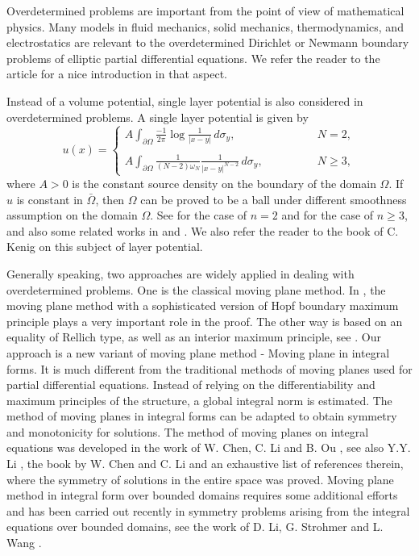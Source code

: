 \documentclass[12pt]{amsproc}
\theoremstyle{plain}
\numberwithin{equation}{section}
\begin{document}
Overdetermined problems are important from the point of view of
mathematical physics. Many models in fluid mechanics, solid
mechanics, thermodynamics, and electrostatics are relevant to the
overdetermined Dirichlet or Newmann boundary problems of elliptic
partial differential equations.
 We refer the reader to the article \cite{FG} for a nice introduction in that aspect.

Instead of a volume potential, single layer potential is also
considered in overdetermined problems. A single layer potential is
given by
\begin{equation}
u(x)=\left \{ \begin{array}{lll}
 A \int_{\partial\Omega}\frac{-1}{2 \pi} \log{\frac{1}{|x-y|}} \,d\sigma_y, \qquad \qquad  & N=2,\\
\\
A \int_{\partial\Omega}
\frac{1}{(N-2)\omega_N}\frac{1}{|x-y|^{N-2}}\,d\sigma_y, \qquad
\qquad & N\geq 3,
\end{array} \right.
\label{sig}
\end{equation}
where $A>0$ is the constant source density on the boundary of the
domain $\Omega$. If $u$ is constant in $\bar\Omega$, then $\Omega$
can be proved to be a ball under different smoothness assumption  on
the  domain $\Omega$.
 See \cite{M} for the case of $n=2$ and
\cite{R1} for the case of $n\geq 3$, and also some related works in
\cite{Lim} and \cite{Sh}. We also refer the reader to the book of C.
Kenig \cite{K} on this subject of layer potential.

Generally speaking,  two approaches are widely applied in dealing
with overdetermined problems. One is the classical moving plane
method. In \cite{Se}, the moving plane method with a sophisticated
version of Hopf boundary maximum principle plays a very important
role in the proof. The other way is based on an equality of Rellich
type, as well as an interior maximum principle, see \cite{W}. Our
approach is a new variant of moving plane method - Moving plane in
integral forms. It is much different from the traditional methods of
moving planes used for partial differential equations. Instead of
relying on the differentiability and maximum principles of the
structure, a global integral norm is estimated. The method of moving
planes in integral forms can be adapted to obtain symmetry and
monotonicity for solutions. The method of moving planes on integral
equations was  developed in the work of  W. Chen, C. Li and B. Ou
\cite{CLO}, see also  Y.Y. Li \cite{Li}, the book by W. Chen and C.
Li \cite{CL1} and an exhaustive list of  references therein, where
the symmetry of solutions in the entire space was proved. Moving
plane method in integral form over bounded domains requires some additional 
efforts and has  been  carried out recently in symmetry
problems arising from the integral equations over bounded domains,
see the work of D. Li, G. Strohmer and L. Wang \cite{LSW}.
\end{document}
